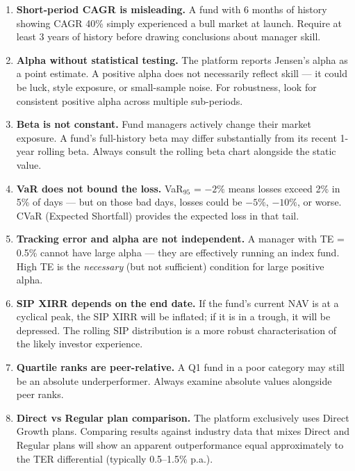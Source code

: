 \documentclass[12pt, a4paper]{article}
\begin{document}
\begin{enumerate}[label=\textbf{\arabic*.}]

\item \textbf{Short-period CAGR is misleading.}  A fund with 6 months of
  history showing CAGR 40\% simply experienced a bull market at launch.
  Require at least 3 years of history before drawing conclusions about
  manager skill.

\item \textbf{Alpha without statistical testing.}  The platform reports
  Jensen's alpha as a point estimate.  A positive alpha does not
  necessarily reflect skill — it could be luck, style exposure, or
  small-sample noise.  For robustness, look for consistent positive
  alpha across multiple sub-periods.

\item \textbf{Beta is not constant.}  Fund managers actively change their
  market exposure.  A fund's full-history beta may differ substantially
  from its recent 1-year rolling beta.  Always consult the rolling beta
  chart alongside the static value.

\item \textbf{VaR does not bound the loss.}  VaR$_{95}$ = $-2\%$ means
  losses exceed 2\% in 5\% of days — but on those bad days, losses
  could be $-5\%$, $-10\%$, or worse.  CVaR (Expected Shortfall)
  provides the expected loss in that tail.

\item \textbf{Tracking error and alpha are not independent.}  A manager
  with TE = 0.5\% cannot have large alpha — they are effectively
  running an index fund.  High TE is the \emph{necessary} (but not
  sufficient) condition for large positive alpha.

\item \textbf{SIP XIRR depends on the end date.}  If the fund's current
  NAV is at a cyclical peak, the SIP XIRR will be inflated; if it is in
  a trough, it will be depressed.  The rolling SIP distribution is a
  more robust characterisation of the likely investor experience.

\item \textbf{Quartile ranks are peer-relative.}  A Q1 fund in a poor
  category may still be an absolute underperformer.  Always examine
  absolute values alongside peer ranks.

\item \textbf{Direct vs Regular plan comparison.}  The platform
  exclusively uses Direct Growth plans.  Comparing results against
  industry data that mixes Direct and Regular plans will show an
  apparent outperformance equal approximately to the TER differential
  (typically 0.5--1.5\% p.a.).

\end{enumerate}
\end{document}
